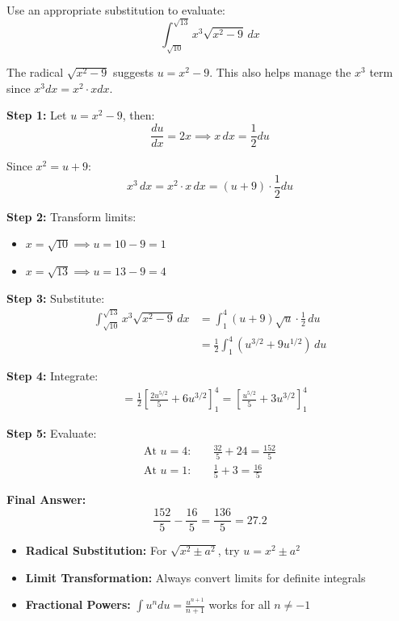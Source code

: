 \begin{problem}
Use an appropriate substitution to evaluate:
\[
\int_{\sqrt{10}}^{\sqrt{13}} x^3 \sqrt{x^2 - 9} \, dx
\]
\end{problem}

\begin{hint}
The radical $\sqrt{x^2-9}$ suggests $u = x^2 - 9$. This also helps manage the $x^3$ term since $x^3 dx = x^2 \cdot x dx$.
\end{hint}

\begin{solution}
\textbf{Step 1:} Let $u = x^2 - 9$, then:
\[
\frac{du}{dx} = 2x \implies x \, dx = \frac{1}{2} du
\]

Since $x^2 = u + 9$:
\[
x^3 \, dx = x^2 \cdot x \, dx = (u+9) \cdot \frac{1}{2} du
\]

\textbf{Step 2:} Transform limits:
\begin{itemize}
\item $x = \sqrt{10} \implies u = 10 - 9 = 1$
\item $x = \sqrt{13} \implies u = 13 - 9 = 4$
\end{itemize}

\textbf{Step 3:} Substitute:
\begin{align*}
    \int_{\sqrt{10}}^{\sqrt{13}} x^3 \sqrt{x^2 - 9} \, dx &= \int_{1}^{4} (u + 9) \sqrt{u} \cdot \frac{1}{2} \, du \\[8pt]
    &= \frac{1}{2} \int_{1}^{4} (u^{3/2} + 9u^{1/2}) \, du
\end{align*}

\textbf{Step 4:} Integrate:
\begin{align*}
    &= \frac{1}{2} \left[ \frac{2u^{5/2}}{5} + 6u^{3/2} \right]_{1}^{4} = \left[ \frac{u^{5/2}}{5} + 3u^{3/2} \right]_{1}^{4}
\end{align*}

\textbf{Step 5:} Evaluate:
\begin{align*}
    \text{At } u=4: & \quad \frac{32}{5} + 24 = \frac{152}{5} \\
    \text{At } u=1: & \quad \frac{1}{5} + 3 = \frac{16}{5}
\end{align*}

\textbf{Final Answer:}
\[
\boxed{\frac{152}{5} - \frac{16}{5} = \frac{136}{5} = 27.2}
\]
\end{solution}

\begin{takeaways}
\begin{itemize}
\item \textbf{Radical Substitution:} For $\sqrt{x^2 \pm a^2}$, try $u = x^2 \pm a^2$
\item \textbf{Limit Transformation:} Always convert limits for definite integrals
\item \textbf{Fractional Powers:} $\int u^n du = \frac{u^{n+1}}{n+1}$ works for all $n \neq -1$
\end{itemize}
\end{takeaways}

